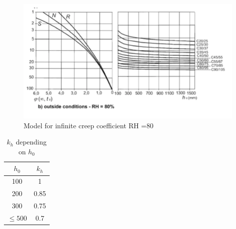 \documentclass[landscape]{article}
\begin{document}
\begin{multicols*}{2}
    \begin{figure}[H]
        \centering
        \includegraphics[width=0.95\linewidth]{img/phi2}
        \caption{Model for infinite creep coefficient RH =80}
        \label{fig:creep_infinity_2}
    \end{figure}

    \begin{table}[H]
    \centering
        \begin{tabular}{cc}
            \toprule
            $h_0$ & $k_h$\tabularnewline
            \midrule
            100 & 1\tabularnewline
            
            200 & 0.85\tabularnewline
            
            300 & 0.75 \tabularnewline
            
            $\leq 500$ & 0.7\tabularnewline
            \bottomrule
        \end{tabular}
        \caption{$k_h$ depending on $h_0$}
        \label{tab:k_h}
    \end{table}




\end{multicols*}
\end{document}
